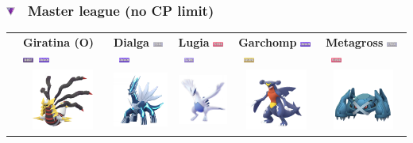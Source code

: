 \documentclass[8pt,aspectratio=169,compress]{beamer}
\newcommand{\flyingfull}{\includegraphics[height=0.15cm]{../../images/type/full/Flying.png}}
\newcommand{\ghostfull}{\includegraphics[height=0.15cm]{../../images/type/full/Ghost.png}}
\newcommand{\dragonfull}{\includegraphics[height=0.15cm]{../../images/type/full/Dragon.png}}
\newcommand{\groundfull}{\includegraphics[height=0.15cm]{../../images/type/full/Ground.png}}
\newcommand{\psychicfull}{\includegraphics[height=0.15cm]{../../images/type/full/Psychic.png}}
\newcommand{\steelfull}{\includegraphics[height=0.15cm]{../../images/type/full/Steel.png}}
\begin{document}
\begin{frame}
\frametitle{\includegraphics[width=0.3cm]{../../pve/guide/master_league.png} ~Master league (no CP limit)}

\begin{tiny}
\begin{block}{}
\begin{center}

\begin{tabular}{rp{2cm}p{2cm}p{2cm}p{2cm}p{2cm}} 
  & \textbf{Giratina (O)} \hfill \ghostfull~\dragonfull& \textbf{Dialga} \hfill \steelfull~\dragonfull & \textbf{Lugia} \hfill\psychicfull~\flyingfull &\textbf{Garchomp} \hfill\dragonfull~\groundfull&\textbf{Metagross} \hfill\steelfull~\psychicfull \\ 
  & \multicolumn{1}{c}{\includegraphics[width=2cm]{../../images/pokemon/giratina_o}} &  \multicolumn{1}{c}{\includegraphics[width=2cm]{../../images/pokemon/dialga} } & \multicolumn{1}{c}{\includegraphics[width=2cm]{../../images/pokemon/lugia} } & \multicolumn{1}{c}{\includegraphics[width=2cm]{../../images/pokemon/garchomp} } & \multicolumn{1}{c}{\includegraphics[width=2cm]{../../images/pokemon/metagross} }  \\ \hline 

\end{tabular}
\end{center}
\end{block}
\end{tiny}
\end{frame}
\end{document}
